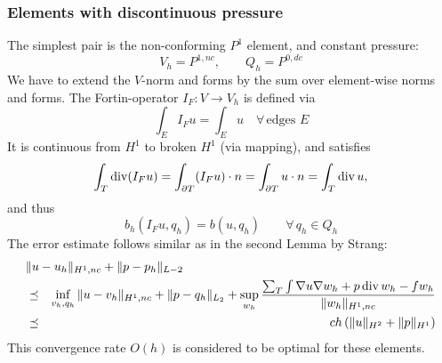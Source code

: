 \subsubsection{Elements with discontinuous pressure}
The simplest pair is the non-conforming $P^1$ element, and constant pressure:
$$
V_h  = P^{1,nc}, \qquad Q_h = P^{0,dc}
$$
We have to extend the $V$-norm and forms by the sum over element-wise norms and forms.
The Fortin-operator $I_F : V \rightarrow V_h$ is defined via
$$
\int_E I_F u = \int_E u \quad \forall \, \text{edges } E
$$
It is continuous from $H^1$ to broken $H^1$ (via mapping), and satisfies
$$
\int_T \operatorname{div} (I_F u) = \int_{\partial T} (I_F u) \cdot n = \int_{\partial T} u \cdot n = \int_T \operatorname{div} u,
$$
and thus
$$
b_h(I_F u, q_h) = b(u, q_h) \qquad \forall \, q_h \in Q_h
$$
The error estimate follows similar as in the second Lemma by Strang:
\begin{eqnarray*}
\lefteqn{\| u - u_h\|_{H^1,nc} + \| p - p_h \|_{L-2}} \\
& \leqc &\inf_{v_h, q_h} \| u - v_h \|_{H^1,nc} + \| p - q_h\|_{L_2} 
+ \sup_{w_h} \frac{ \sum_T \int \nabla u \nabla w_h   + p \opdiv w_h - f w_h} {\| w_h \|_{H^1,nc} } \\
& \leqc & c h \, (  \| u \|_{H^2} + \| p \|_{H^1} )
\end{eqnarray*}
This convergence rate $O(h)$ is considered to be optimal for these elements.

